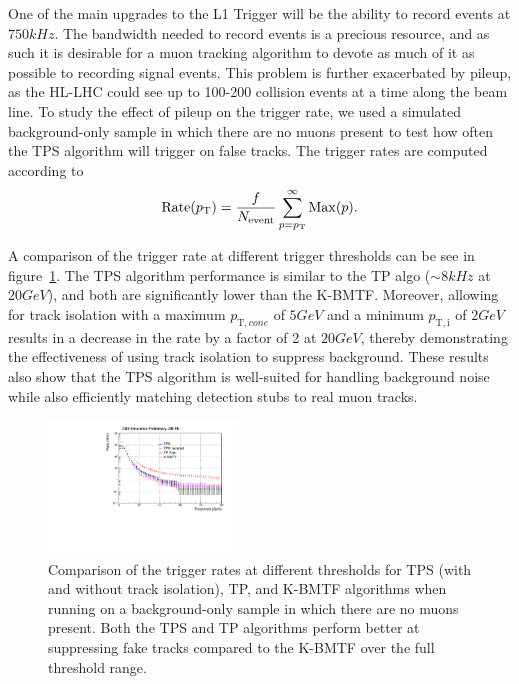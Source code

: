 One of the main upgrades to the L1 Trigger will be the ability to record events at $750\unit{kHz}$.
The bandwidth needed to record events is a precious resource, and as such it is desirable for a muon tracking algorithm to devote as much of it as possible to recording signal events.
This problem is further exacerbated by pileup, as the HL-LHC could see up to 100-200 collision events at a time along the beam line.
To study the effect of pileup on the trigger rate, we used a simulated background-only sample in which there are no muons present to test how often the TPS algorithm will trigger on false tracks.
The trigger rates are computed according to
\begin{equation}\label{eq:rate} %
  \mathrm{Rate}(\pt)=\frac{f}{N_\mathrm{event}}\sum_{p=\pt}^\infty\mathrm{Max}(p).
\end{equation}

A comparison of the trigger rate at different trigger thresholds can be see in figure~\ref{fig:rates}.
The TPS algorithm performance is similar to the TP algo ($\sim8\unit{kHz}$ at $20\unit{GeV}$), and both are significantly lower than the K-BMTF.
Moreover, allowing for track isolation with a maximum $p_{\mathrm{T},cone}$ of $5\unit{GeV}$ and a minimum $p_{\mathrm{T,i}}$ of $2\unit{GeV}$ results in a decrease in the rate by a factor of 2 at $20\unit{GeV}$, thereby demonstrating the effectiveness of using track isolation to suppress background.
These results also show that the TPS algorithm is well-suited for handling background noise while also efficiently matching detection stubs to real muon tracks.

\begin{figure}[htbp] %
  \centering
  \includegraphics[width=0.45\textwidth]{fig/TPS/rate.pdf}
  \caption{
    Comparison of the trigger rates at different \pt thresholds for TPS (with and without track isolation), TP, and K-BMTF algorithms when running on a background-only sample in which there are no muons present.
    Both the TPS and TP algorithms perform better at suppressing fake tracks compared to the K-BMTF over the full \pt threshold range.
  }
  \label{fig:rates}
\end{figure}

